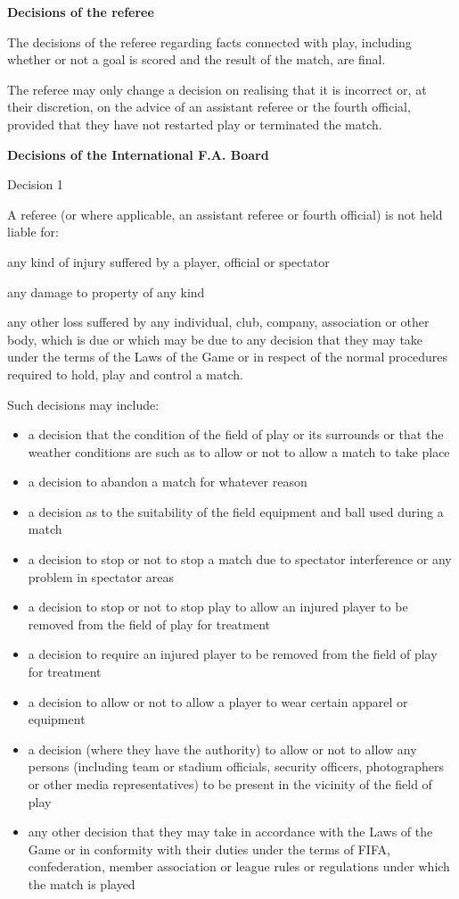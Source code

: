 \bigskip

{\bfseries Decisions of the referee}

\headlinebox

The decisions of the referee regarding facts connected with play, including whether or not a goal is scored and the result of the match, are final.

\bigskip

The referee may only change a decision on realising that it is incorrect or, at their discretion, on the advice of an assistant referee or the fourth official, provided that they have not restarted play or terminated the match.


\clearpage
{\bfseries Decisions of the International F.A. Board }

\headlinebox

Decision 1

A referee (or where applicable, an assistant referee or fourth official) is not held liable for:

any kind of injury suffered by a player, official or spectator

any damage to property of any kind

any other loss suffered by any individual, club, company, association or other body, which is due or which may be due to any decision that they may take under the terms of the Laws of the Game or in respect of the normal procedures required to hold, play and control a match.

\bigskip

Such decisions may include:

\begin{itemize}
\item a decision that the condition of the field of play or its surrounds or that the weather conditions are such as to allow or not to allow a match to take place
\item a decision to abandon a match for whatever reason
\item a decision as to the suitability of the field equipment and ball used during a match
\item a decision to stop or not to stop a match due to spectator interference or any problem in spectator areas 
\item a decision to stop or not to stop play to allow an injured player to be removed from the field of play for treatment 
\item a decision to require an injured player to be removed from the field of play for treatment 
\item a decision to allow or not to allow a player to wear certain apparel or equipment 
\item a decision (where they have the authority) to allow or not to allow any persons (including team or stadium officials, security officers, photographers or other media representatives) to be present in the vicinity of the field of play 
\item any other decision that they may take in accordance with the Laws of the Game or in conformity with their duties under the terms of FIFA, confederation, member association or league rules or regulations under which the match is played 
\end{itemize}


